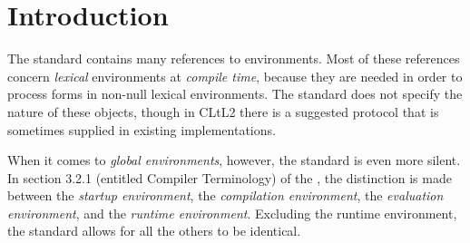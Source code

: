 \section{Introduction}

The \commonlisp{} standard contains many references to environments.
Most of these references concern \emph{lexical} environments at
\emph{compile time}, because they are needed in order to process forms
in non-null lexical environments.  The standard does not specify the
nature of these objects, though in CLtL2 \cite{Steele:1990:CLL:95411}
there is a suggested protocol that is sometimes supplied in existing
\commonlisp{} implementations. 

When it comes to \emph{global environments}, however, the standard is
even more silent.  In section 3.2.1 (entitled Compiler Terminology) of
the \commonlisp{} \hs{}, the distinction is made between the
\emph{startup environment}, the \emph{compilation environment}, the
\emph{evaluation environment}, and the \emph{runtime environment}.
Excluding the runtime environment, the standard allows for all the
others to be identical.

